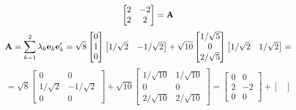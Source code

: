 \begin{enumerate}[font=\bfseries]
\begin{enumerate}
\[\begin{bmatrix}
                    2 & -2 \\
                    2 & 2
                \end{bmatrix}
                =
                \bold{A}
            \]
            \[
                \bold{A}
                =
                \sum_{k=1}^2{\lambda_k\bold{e}_k\bold{e}_k^\prime}
                =
                \sqrt{8}
                \begin{bmatrix}
                    0 \\
                    1 \\
                    0
                \end{bmatrix}
                \begin{bmatrix}
                    1/\sqrt{2} & -1/\sqrt{2}
                \end{bmatrix}
                +
                \sqrt{10}
                \begin{bmatrix}
                    1/\sqrt{5} \\
                    0 \\
                    2/\sqrt{5}
                \end{bmatrix}
                \begin{bmatrix}
                    1/\sqrt{2} & 1/\sqrt{2}
                \end{bmatrix}
                =
            \]
            \[
                =
                \sqrt{8}
                \begin{bmatrix}
                    0 & 0 \\
                    1/\sqrt{2} & -1/\sqrt{2} \\
                    0 & 0
                \end{bmatrix}
                +
                \sqrt{10}
                \begin{bmatrix}
                    1/\sqrt{10} & 1/\sqrt{10} \\
                    0 & 0 \\
                    2/\sqrt{10} & 2/\sqrt{10}
                \end{bmatrix}
                =
                \begin{bmatrix}
                    0 & 0 \\
                    2 & -2 \\
                    0 & 0
                \end{bmatrix}
                +
                \begin{bmatrix}

\end{bmatrix}\]
\end{enumerate}
\end{enumerate}
